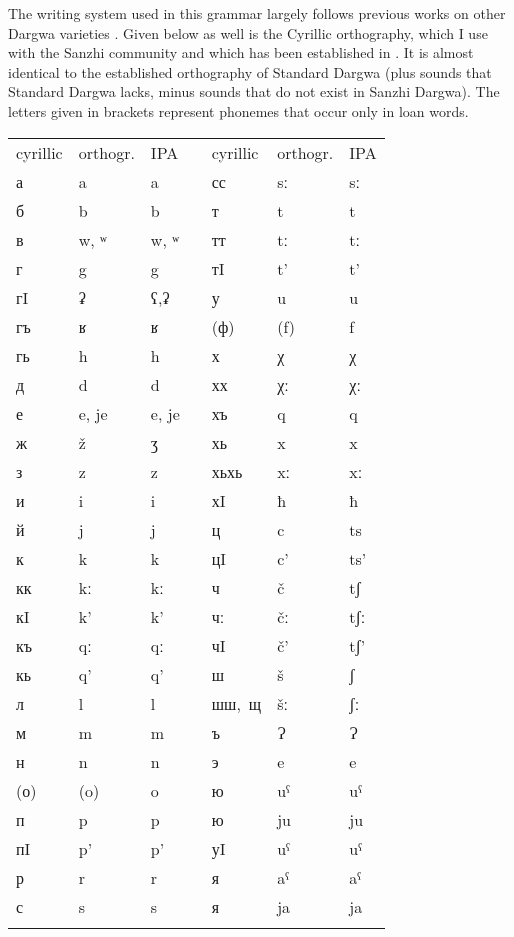 \label{Orthographic conventions}

The writing system used in this grammar largely follows previous works on other Dargwa varieties \citep[e.g.]{Sumbatova.Mutalov2003}. Given below as well is the Cyrillic orthography, which I use with the Sanzhi community and which has been established in \citet{Forker.Gadzhimuradov2017}. It is almost identical to the established orthography of Standard Dargwa (plus sounds that Standard Dargwa lacks, minus sounds that do not exist in Sanzhi Dargwa). The letters given in brackets represent phonemes that occur only in loan words.
%
\largerpage[2]
\begin{table}[h!]
	\centering
	\small
	\begin{tabularx}{0.75\textwidth}[]{lllXlll}
	\lsptoprule
			cyrillic &	orthogr. &	IPA	&	{}	&	cyrillic &	orthogr. &	IPA\\
		\cmidrule{1-3} \cmidrule{5-7}
			а	&	a	&	a	&	{}	&	сс	&	sː	&	sː\\
			б	&	b	&	b	&	{}	&	т	&	t	&	t\\
			в	&	w, ʷ	&	w, ʷ	&	{}	&	тт	&	tː	&	tː\\
			г	&	g 	&	g	&	{}	&	тI	&	t’	&	t’\\
			гI	&	ʡ	&	ʕ,ʡ	&	{}	&	у	&	u	&	u\\
			гъ	&	ʁ	&	ʁ	&	{}	&	(ф)	&	(f)	&	f\\
			гь	&	h	&	h	&	{}	&	х	&	χ	&	χ\\
			д	&	d	&	d	&	{}	&	хх	&	χː	&	χː\\
			е	&	e, je	&	e, je	&	{}	&	хъ	&	q	&	q\\	
			ж	&	ž	&	ʒ	&	{}	&	хь	&	x	&	x\\   
			з	&	z	&	z	&	{}	&	хьхь	&	xː	&	xː\\
			и	&	i	&	i	&	{}	&	хI	&	ħ	&	ħ\\
			й	&	j	&	j	&	{}	&	ц	&	c	&	ts\\
			к	&	k	&	k	&	{}	&	цI	&	c’	&	ts’\\
			кк	&	kː	&	kː	&	{}	&	ч	&	č	&	tʃ\\
			кI	&	k’	&	k’	&	{}	&	чː	&	čː	&	tʃː\\
			къ	&	qː	&	qː	&	{}	&	чI	&	č’	&	tʃ’\\
			кь	&	q’	&	q’	&	{}	&	ш	&	š	&	ʃ\\
			л	&	l	&	l	&	{}	&	\mbox{шш, щ}& šː	&	ʃː\\
			м	&	m	&	m	&	{}	&	ъ	&	Ɂ	&	Ɂ\\
			н	&	n	&	n	&	{}	&	э	&	e	&	e\\
			(о)	&	(o)	&	o	&	{}	&	ю	&	uˁ	&	uˁ\\
			п	&	p	&	p	&	{}	&	ю	&	ju	&	ju\\
			пI	&	p’	&	p’	&	{}	&	уI	&	uˁ	&	uˁ\\
			р	&	r	&	r	&	{}	&	я	&	aˁ	&	aˁ\\
			с	&	s	&	s	&	{}	&	я	&	ja	&	ja\\
			\lspbottomrule
	\end{tabularx}
\end{table}


